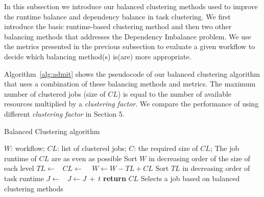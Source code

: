 \documentclass[final]{IEEEtran}
\begin{document}
In this subsection we introduce our balanced clustering methods used to improve the runtime balance and dependency balance in task clustering. We first introduce the basic runtime-based clustering method and then two other balancing methods that addresses the Dependency Imbalance problem. We use the metrics presented in the previous subsection to evaluate a given workflow to decide which balancing method(s) is(are) more appropriate. 

Algorithm~\ref{alg:admit} shows the pseudocode of our balanced clustering algorithm that uses a combination of these balancing methods and metrics.  The maximum number of clustered jobs (size of $CL$) is equal to the number of available resources multiplied by a \emph{clustering factor}. We compare the performance of using different \emph{clustering factor} in Section 5. 

\begin{algorithm}[htb]
	\caption{ Balanced Clustering algorithm}
	\small
	\label{alg:admit}
	\begin{algorithmic}[1]
		\Require $W$: workflow; $CL$: list of clustered jobs; $C$: the required size of $CL$; 
		\Ensure The job runtime of $CL$ are as even as possible
			\State Sort $W$ in decreasing order of the size of each level
				\State $TL\gets $\  
				\State $CL\gets$  \  
				\State $W \gets W - TL + CL$   
			\EndFor
		\EndProcedure
			\State Sort $TL$ in decreasing order of task runtime
				\State $J \gets $\  
				\State  $J \gets J\ +\ t$ 
			\EndFor
			\State \textbf{return} $CL$
		\EndProcedure
			\State Selects a job based on balanced clustering methods
		\EndProcedure
	\end{algorithmic}
\end{algorithm}
\end{document}
